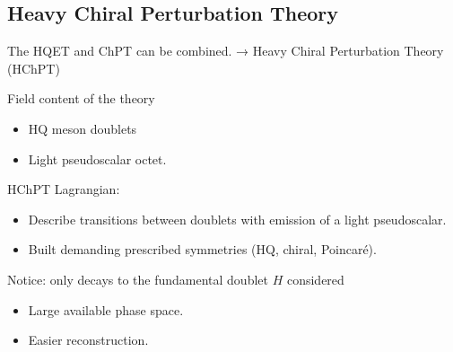 \documentclass[professionalfonts,aspectratio=169]{beamer}
\begin{document}
\subsection{Heavy Chiral Perturbation Theory}

\begin{frame}
  The HQET and ChPT can be combined. → \alert{Heavy Chiral Perturbation Theory (HChPT)}

  \pause
  Field content of the theory 
  \begin{itemize}
    \item
      HQ meson doublets 
    \item
      Light pseudoscalar octet.
  \end{itemize}

  \pause
  HChPT Lagrangian: 
  \begin{itemize}
    \item 
      Describe transitions between doublets with emission of a light pseudoscalar.
    \item
      Built demanding prescribed symmetries (HQ, chiral, Poincaré).
  \end{itemize} 
  \pause
  \begin{alertblock}{Notice: only decays to the fundamental doublet \(H\) considered}
    \vspace{0pt}
    \begin{itemize}
      \item
        Large available phase space.
      \item
        Easier reconstruction.
    \end{itemize}
  \end{alertblock}
\end{frame}
 
\end{document}
